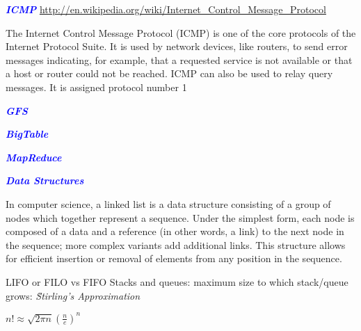 \documentclass[9pt]{amsart}
\newcommand{\filldots}{\noindent \textbf {\textcolor {blue} {\dotfill}} }
\begin{document}
\begin{multicols}{2}
\filldots
 
\noindent \textbf {\textcolor {blue} {\em ICMP}} 
\url {http://en.wikipedia.org/wiki/Internet_Control_Message_Protocol}

The Internet Control Message Protocol (ICMP) is one of the core protocols of the Internet Protocol Suite. It is used by network devices, like routers, to send error messages indicating, for example, that a requested service is not available or that a host or router could not be reached. ICMP can also be used to relay query messages. It is assigned protocol number 1

\filldots
 
\noindent \textbf {\textcolor {blue} {\em GFS}} 

\filldots
 
\noindent \textbf {\textcolor {blue} {\em BigTable}} 

\filldots 

\noindent \textbf {\textcolor {blue} {\em MapReduce}} 

\filldots 

\noindent \textbf {\textcolor {blue} {\em Data Structures}} 

\filldots 

\noindent {\textcolor {blue} {\em Linked Lists}} 
\noindent In computer science, a linked list is a data structure consisting of a group of nodes which together represent a sequence. Under the simplest form, each node is composed of a data and a reference (in other words, a link) to the next node in the sequence; more complex variants add additional links. This structure allows for efficient insertion or removal of elements from any position in the sequence.
\filldots 

\noindent {\textcolor {blue} {\em Binary Trees}} 

\filldots 

\noindent {\textcolor {blue} {\em Tries}} 

\filldots 

\noindent {\textcolor {blue} {\em Stacks \& Queues}} 

LIFO or FILO vs FIFO
Stacks and queues: maximum size to which stack/queue grows:
{\em {\u Stirling's Approximation}}

$n! \approx \sqrt{2 \pi n} (\frac {n}{e})^n$

\filldots 

\noindent {\textcolor {blue} {\em Vector/ArrayLists}} 

\filldots 

\noindent {\textcolor {blue} {\em Hash Tables}} 


\end{multicols}
\end{document}
